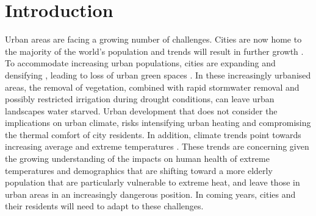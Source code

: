 \documentclass[final,3p,times,authoryear]{elsarticle}
\begin{document}

\section{Introduction}\label{sec:introduction}
Urban areas are facing a growing number of challenges. Cities are now home to the majority of the world's population and trends will result in further growth \citep{UNDESA2015,WHO2016}. To accommodate increasing urban populations, cities are expanding \citep{Seto2011} and densifying \citep{Byrne2016,Ruth2016,DSE2002}, leading to loss of urban green spaces \citep{Hamin2009,Coutts2007}. In these increasingly urbanised areas, the removal of vegetation, combined with rapid stormwater removal and possibly restricted irrigation during drought conditions, can leave urban landscapes water starved. Urban development that does not consider the implications on urban climate, risks intensifying urban heating and compromising the thermal comfort of city residents. In addition, climate trends point towards increasing average and extreme temperatures \citep{Alexander2009,IPCC2013a}. These trends are concerning given the growing understanding of the impacts on human health of extreme temperatures \citep{Katsouyanni1993,Nicholls2008,Loughnan2010} and demographics that are shifting toward a more elderly population \citep{Cohen2003,FIFARS2016} that are particularly vulnerable to extreme heat, and leave those in urban areas in an increasingly dangerous position. In coming years, cities and their residents will need to adapt to these challenges.
\end{document}

